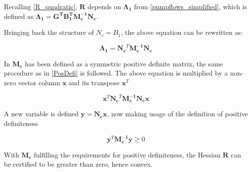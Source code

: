 Recalling \eqref{R_quadratic}, $\bm{R}$ depends on $\bm{\Lambda_1}$ from \eqref{pumpflows_simplified}, which is defined as $\bm{\Lambda_1} =\bm{G^T} \bm{B_{1}^T}\bm{M_c^{-1}}\bm{N_c}$.

Bringing back the structure of $N_c = B_1$, the above equation can be rewritten as:

\begin{equation}
\bm{\Lambda_1} =\bm{N_c}^{T} \bm{M_c^{-1}}\bm{N_c}
\end{equation}

In \secref{} $\bm{M_c}$ has been defined as a symmetric positive definite matrix, the same procedure as in \eqref{PosDefi} is followed. The above equation is multiplied by a non-zero vector column $\bm{x}$ and its transpose $\bm{x}^{T}$

\begin{equation}
	\bm{x}^{T}\bm{N_c}^{T} \bm{M_c^{-1}}\bm{N_c}\bm{x}
\end{equation}

A new variable is defined $\bm{y} = \bm{N_c}\bm{x}$, now making usage of the definition of positive definiteness 

\begin{equation}
	\bm{y}^{T} \bm{M_c^{-1}} \bm{y} \geqslant 0
	\label{Def_Mc}
\end{equation}

 With $\bm{M_c}$ fulfilling the requirements for positive definiteness, the Hessian $\bm{R}$ can be certified to be greater than zero, hence convex.






%
%
%
%
%



